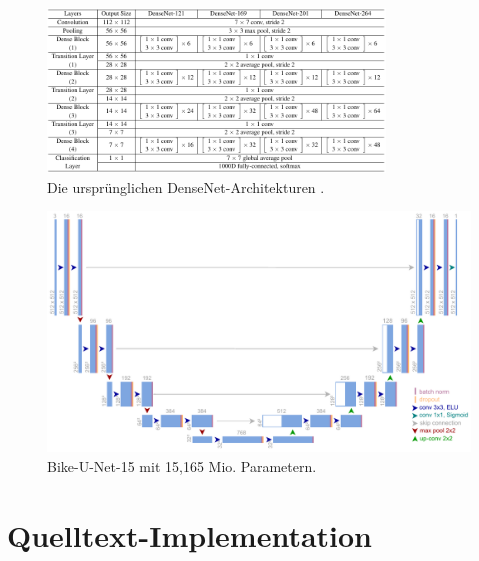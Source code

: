 \begin{figure}
	\centering
	\includegraphics[width=0.8\textwidth]{Bilder/densenet121-architecture.pdf} 
	\caption{Die ursprünglichen DenseNet-Architekturen \cite{Huang.25082016}.}
	\label{fig:densenet121-architecture}
\end{figure} 

\begin{figure}
	\centering
	\includegraphics[width=1.\textwidth]{Bilder/own-unet-15mil.pdf} 
	\caption{Bike-U-Net-15 mit 15,165 Mio. Parametern.}
	\label{fig:bike-unet-15}
\end{figure} 

\pagebreak

\section{Quelltext-Implementation}



